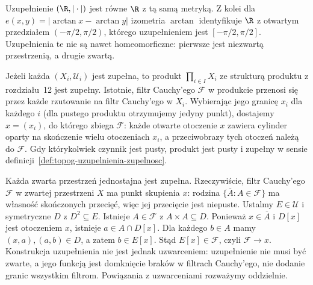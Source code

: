 \begin{przyklad}
\label{ex:topog-uzupelnienia-dwie-metryki}
Uzupełnienie $(\R,|\cdot|)$ jest równe
$\R$ z tą samą metryką. Z kolei dla
$e(x,y)=|\arctan x-\arctan y|$
izometria $\arctan$ identyfikuje $\R$
z otwartym przedziałem
$(-\pi/2,\pi/2)$, którego uzupełnieniem
jest $[-\pi/2,\pi/2]$.
Uzupełnienia te nie są nawet
homeomorficzne: pierwsze jest niezwartą
przestrzenią, a drugie zwartą.
\end{przyklad}

\begin{przyklad}
\label{ex:topog-uzupelnienia-produkt}
Jeżeli każda $(X_i,\mathcal U_i)$ jest
zupełna, to produkt $\prod_{i\in I}X_i$
ze strukturą produktu z rozdziału~12
jest zupełny. Istotnie, filtr Cauchy'ego
$\mathcal F$ w produkcie przenosi się
przez każde rzutowanie na filtr Cauchy'ego
w $X_i$. Wybierając jego granicę $x_i$
dla każdego $i$ (dla pustego produktu
otrzymujemy jedyny punkt), dostajemy
$x=(x_i)$, do którego zbiega
$\mathcal F$: każde otwarte otoczenie
$x$ zawiera cylinder oparty na skończenie
wielu otoczeniach $x_i$, a przeciwobrazy
tych otoczeń należą do $\mathcal F$.
Gdy którykolwiek czynnik jest pusty,
produkt jest pusty i zupełny w sensie
definicji~\ref{def:topog-uzupelnienia-zupelnosc}.
\end{przyklad}

\begin{uwaga}
Każda zwarta przestrzeń jednostajna jest
zupełna. Rzeczywiście, filtr Cauchy'ego
$\mathcal F$ w zwartej przestrzeni $X$
ma punkt skupienia $x$: rodzina
$\{\overline A:A\in\mathcal F\}$ ma własność
skończonych przecięć, więc jej przecięcie
jest niepuste. Ustalmy $E\in\mathcal U$
i symetryczne $D$ z $D^2\subseteq E$.
Istnieje $A\in\mathcal F$ z
$A\times A\subseteq D$. Ponieważ
$x\in\overline A$ i $D[x]$ jest otoczeniem
$x$, istnieje $a\in A\cap D[x]$.
Dla każdego $b\in A$ mamy
$(x,a),(a,b)\in D$, a zatem
$b\in E[x]$. Stąd $E[x]\in\mathcal F$,
czyli $\mathcal F\to x$.
Konstrukcja uzupełnienia
nie jest jednak uzwarceniem:
uzupełnienie nie musi być zwarte,
a jego funkcją jest domknięcie braków
w filtrach Cauchy'ego, nie dodanie granic
wszystkim filtrom. Powiązania z
uzwarceniami rozważymy oddzielnie.
\end{uwaga}
